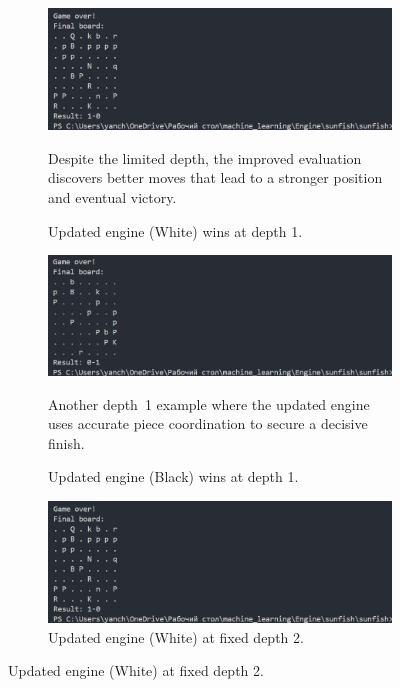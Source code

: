 \documentclass[12pt,a4paper]{article}
\begin{document}
\begin{figure}[htp]
    \vspace{1em}

    \begin{subfigure}[b]{0.49\textwidth}
        \centering
        \includegraphics[width=\textwidth]{figures/yanfishwhitedepth1.png}
        \caption{Updated engine (White) wins at depth 1.}
        \label{fig:screenshot3}
        
        \vspace{0.5em}
        \small
        Despite the limited depth, the improved evaluation 
        discovers better moves that lead to a stronger 
        position and eventual victory.
    \end{subfigure}
    \hfill
    \begin{subfigure}[b]{0.49\textwidth}
        \centering
        \includegraphics[width=\textwidth]{figures/yanfishblackdepth1.png}
        \caption{Updated engine (Black) wins at depth 1.}
        \label{fig:screenshot4}
        
        \vspace{0.5em}
        \small
        Another depth~1 example where the updated engine 
        uses accurate piece coordination to secure a 
        decisive finish.
    \end{subfigure}

    \vspace{1em}

    \begin{subfigure}[b]{0.49\textwidth}
        \centering
        \includegraphics[width=\textwidth]{figures/yanfishwhitedepth1.png}
        \caption{Updated engine (White) at fixed depth 2.}
        \label{fig:screenshot5}
        

\end{subfigure}
\end{figure}
\end{document}
